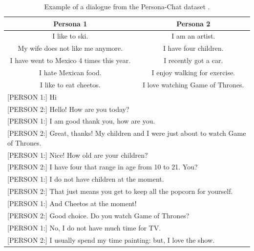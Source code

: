 \begin{table}[ht]
  \begin{tabular}{ |c|c| }
   \hline
   \textbf{Persona 1} & \textbf{Persona 2}  \\ 
   \hline
    I like to ski. & I am an artist. \\
    My wife does not like me anymore. & I have four children. \\
    I have went to Mexico 4 times this year. & I recently got a car. \\
    I hate Mexican food. & I enjoy walking for exercise. \\
    I like to eat cheetos. & I love watching Game of Thrones. \\
    \hline
    \multicolumn{2}{l}{[PERSON 1:] Hi} \\
    \multicolumn{2}{l}{[PERSON 2:] Hello! How are you today?} \\
    \multicolumn{2}{l}{[PERSON 1:] I am good thank you, how are you.} \\
    \multicolumn{2}{l}{[PERSON 2:] Great, thanks! My children and I were just about to watch Game of Thrones.} \\
    \multicolumn{2}{l}{[PERSON 1:] Nice! How old are your children?} \\
    \multicolumn{2}{l}{[PERSON 2:] I have four that range in age from 10 to 21. You?} \\
    \multicolumn{2}{l}{[PERSON 1:] I do not have children at the moment.} \\
    \multicolumn{2}{l}{[PERSON 2:] That just means you get to keep all the popcorn for yourself.} \\
    \multicolumn{2}{l}{[PERSON 1:] And Cheetos at the moment!} \\
    \multicolumn{2}{l}{[PERSON 2:] Good choice. Do you watch Game of Thrones?} \\
    \multicolumn{2}{l}{[PERSON 1:] No, I do not have much time for TV.} \\
    \multicolumn{2}{l}{[PERSON 2:] I usually spend my time painting: but, I love the show.} \\
    \hline
  \end{tabular}
  \caption{Example of a dialogue from the Persona-Chat dataset \cite{zhang2018personalizing}.}
\label{tab:persona_chat}
\end{table}

